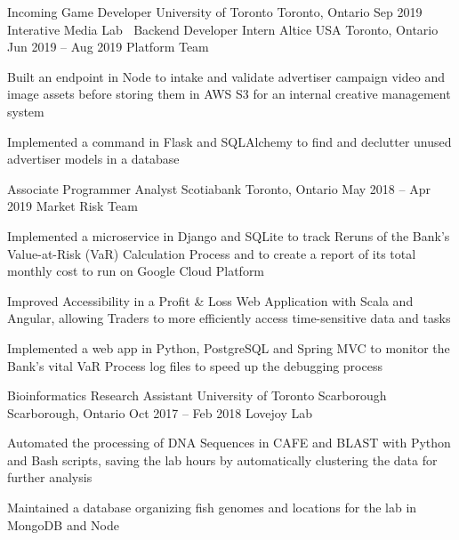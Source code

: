 \begin{cventries}
  \cventry
    {Incoming Game Developer}
    {University of Toronto}
    {Toronto, Ontario}
    {Sep 2019}
    {Interative Media Lab}
    {
      $\:$
    }
  \cventry
    {Backend Developer Intern}
    {Altice USA}
    {Toronto, Ontario}
    {Jun 2019 -- Aug 2019}
    {Platform Team}
    {
    \begin{cvitems}
      \item {Built an endpoint in Node to intake and validate advertiser campaign video and image assets before storing them in AWS S3 for an internal creative management system}
      \item {Implemented a command in Flask and SQLAlchemy to find and declutter unused advertiser models in a database}
    \end{cvitems}
    }
  \cventry
    {Associate Programmer Analyst}
    {Scotiabank}
    {Toronto, Ontario}
    {May 2018 -- Apr 2019}
    {Market Risk Team}
    {
      \begin{cvitems}
        \item {Implemented a microservice in Django and SQLite to track Reruns of the Bank's Value-at-Risk (VaR) Calculation Process and to create a report of its total monthly cost to run on Google Cloud Platform}
        \item {Improved Accessibility in a Profit \& Loss Web Application with Scala and Angular, allowing Traders to more efficiently access time-sensitive data and tasks}
        \item {Implemented a web app in Python, PostgreSQL and Spring MVC to monitor the Bank's vital VaR Process log files to speed up the debugging process}
      \end{cvitems}
    }

  \cventry
    {Bioinformatics Research Assistant}
    {University of Toronto Scarborough}
    {Scarborough, Ontario}
    {Oct 2017 -- Feb 2018}
    {Lovejoy Lab}
    {
      \begin{cvitems}
        \item {Automated the processing of DNA Sequences in CAFE and BLAST with Python and Bash scripts, saving the lab hours by automatically clustering the data for further analysis}
        \item {Maintained a database organizing fish genomes and locations for the lab in MongoDB and Node}
      \end{cvitems}
    }
\end{cventries}
